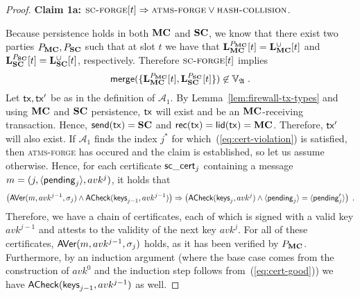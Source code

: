 \begin{proof}
  \textbf{Claim 1a:}
  $\textsc{sc-forge}[t] \Rightarrow \textsc{atms-forge} \lor \textsc{hash-collision}$.

  \noindent
  Because persistence holds in both $\mathbf{MC}$ and $\mathbf{SC}$, we know that there exist two parties $P_{\mathbf{MC}}, P_{\mathbf{SC}}$
  such that at slot $t$ we have that $\mathbf{L}_{\mathbf{MC}}^{P_{\mathbf{MC}}}[t] =
  \mathbf{L}_{\mathbf{MC}}^{\cup}[t]$ and $\mathbf{L}_{\mathbf{SC}}^{P_{\mathbf{SC}}}[t] =
  \mathbf{L}_{\mathbf{SC}}^{\cup}[t]$,
  respectively. Therefore $\textsc{sc-forge}[t]$ implies
  $$
    \mathsf{merge}(\{
      \mathbf{L}_{\mathbf{MC}}^{P_{\mathbf{MC}}}[t],
      \mathbf{L}_{\mathbf{SC}}^{P_{\mathbf{SC}}}[t]
    \}) \not\in \mathbb{V}_{\mathfrak{A}}
  \; .
  $$
  Let $\mathsf{tx}, \mathsf{tx}'$ be as in the definition of
  $\mathcal{A}_1$.
  By Lemma~\ref{lem:firewall-tx-types} and using $\mathbf{MC}$ and $\mathbf{SC}$
  persistence, $\mathsf{tx}$ will exist and
  be an $\mathbf{MC}$-receiving transaction.
  Hence, $\mathsf{send}(\mathsf{tx}) = \mathbf{SC}$ and $\mathsf{rec}(\mathsf{tx}) = \mathsf{lid}(\mathsf{tx}) = \mathbf{MC}$.
  Therefore, $\mathsf{tx}'$ will also exist.
  If $\mathcal{A}_1$ finds the index $j^*$ for which~(\ref{eq:cert-violation})
  is satisfied,
  then \textsc{atms-forge} has occured and the claim is established, so let us assume otherwise.
  Hence, for each certificate
  $\mathsf{sc\_cert}_j$ containing a message $m = (j,\langle\mathsf{pending}_j\rangle, avk^j)$, it
  holds that
  \begin{equation}
    \label{eq:cert-good}
    \left(
      \textsf{AVer}(m, avk^{j-1}, \sigma_j)
      \land
      \textsf{ACheck}(\textsf{keys}_{j-1}, avk^{j-1})
    \right)
    \Rightarrow
    \left(
      \textsf{ACheck}(\textsf{keys}_j, avk^j)
      \land
      \langle\mathsf{pending}_j\rangle = \langle\mathsf{pending}'_j\rangle
    \right)
    \; .
  \end{equation}
  Therefore, we have a chain of certificates, each of which is signed with a
  valid key $avk^{j-1}$ and attests to the validity of the next key $avk^j$.
  For all of these certificates, $\textsf{AVer}(m, avk^{j-1}, \sigma_j)$ holds,
  as it has been verified by $P_{\mathbf{MC}}$.
  Furthermore, by an induction argument (where the base case comes from the
  construction of $avk^0$ and the induction step follows
  from~(\ref{eq:cert-good})) we have
  $\textsf{ACheck}(\textsf{keys}_{j-1}, avk^{j-1})$ as well.


\end{proof}

